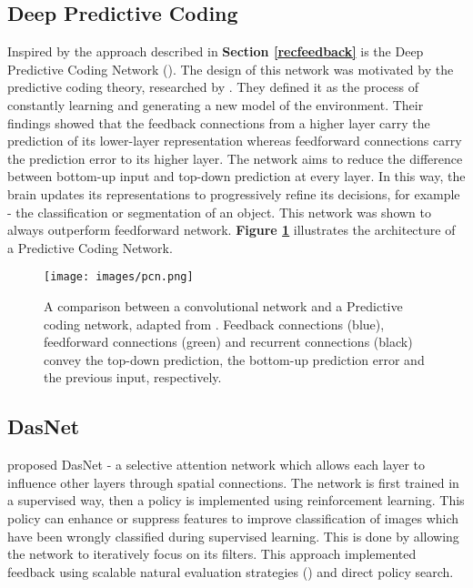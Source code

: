 \documentclass{l4proj}
\begin{document}
\subsection{Deep Predictive Coding}
Inspired by the approach described in  \textbf{Section \ref{recfeedback}} is the Deep Predictive Coding Network (\cite{deeppcn}). The design of this network was motivated by the predictive coding theory, researched by \cite{predcod}. They defined it as the process of constantly learning and generating a new model of the environment. Their findings showed that the feedback connections from a higher layer carry the prediction of its lower-layer representation whereas feedforward connections carry the prediction error to its higher layer. The network aims to reduce the difference between bottom-up input and top-down prediction at every layer. In this way, the brain updates its representations to progressively refine its decisions, for example - the classification or segmentation of an object. This network was shown to always outperform feedforward network. \textbf{Figure \ref{fig:pcn}} illustrates the architecture of a Predictive Coding Network.

\begin{figure}
    \centering
    \texttt{[image: images/pcn.png]}
    \caption{A comparison between a convolutional network and a Predictive coding network, adapted from \cite{deeppcn}. Feedback connections (blue), feedforward connections (green) and recurrent connections (black) convey the top-down prediction, the bottom-up prediction error and the previous input, respectively.}
    \label{fig:pcn} 
\end{figure}

\subsection{DasNet}
\label{dasnet}
\cite{dasnet} proposed DasNet - a selective attention network which allows each layer to influence other layers through spatial connections.
The network is first trained in a supervised way, then a policy is implemented using reinforcement learning. This policy can enhance or suppress features to improve classification of images which have been wrongly classified during supervised learning. This is done by allowing the network to iteratively focus on its filters. This approach implemented feedback using scalable natural evaluation strategies (\cite{SNES}) and direct policy search.
\end{document}
